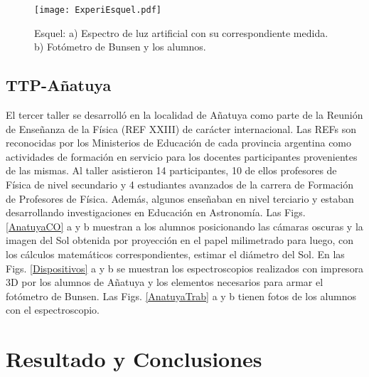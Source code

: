 \documentclass[baaa]{baaa}
\begin{document}
\begin{figure}[!t]
\centering
\texttt{[image: ExperiEsquel.pdf]}
\caption{Esquel: a) Espectro de luz artificial con su correspondiente medida. b) Fot\'ometro de Bunsen y los alumnos.}
\label{EspectroEsq}
\end{figure}

\subsection{TTP-A\~natuya}
El tercer taller se desarroll\'o en la localidad de A\~natuya como parte de la Reuni\'on de Ense\~nanza de la F\'isica (REF XXIII) de car\'acter internacional. Las REFs son reconocidas por los Ministerios de Educaci\'on de cada provincia argentina como actividades de formaci\'on en servicio para los docentes participantes provenientes de las mismas. Al taller asistieron 14 participantes, 10 de ellos profesores de F\'isica de nivel secundario y 4 estudiantes avanzados de la carrera de Formaci\'on de Profesores de F\'isica. Adem\'as, algunos ense\~naban en nivel terciario y estaban desarrollando investigaciones en Educaci\'on en Astronom\'ia. Las Figs. \ref{AnatuyaCO} a y b muestran a los alumnos posicionando las c\'amaras oscuras y la imagen del Sol obtenida por proyecci\'on en el papel milimetrado para luego, con los c\'alculos matem\'aticos correspondientes, estimar el di\'ametro del Sol. En las Figs. \ref{Dispositivos} a y b se muestran los espectroscopios realizados con impresora 3D por los alumnos de A\~natuya y los elementos necesarios para armar el fot\'ometro de Bunsen. Las Figs. \ref{AnatuyaTrab} a y b tienen fotos de los alumnos con el espectroscopio. 

\section{{\bf Resultado y Conclusiones}}
\end{document}
